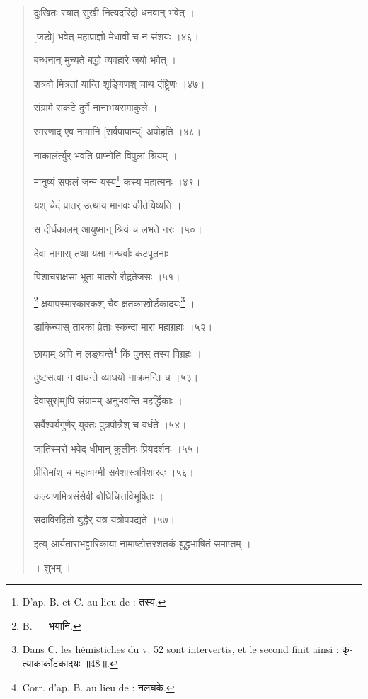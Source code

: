 \documentclass[a4paper, 11pt, oneside, french]{article}
\begin{document}
\begin{quotation}
\texthindi{दुःखितः स्यात् सुखी नित्यदरिद्रो धनवान् भवेत् ।}

\texthindi{[जडो] भवेत् महाप्राज्ञो मेधावी च न संशयः ।४६।}

\bigskip

\texthindi{बन्धनान् मुच्यते बद्धो व्यवहारे जयो भवेत् ।}

\texthindi{शत्रवो मित्रतां यान्ति शृङ्गिणश् चाथ दंष्ट्रिणः ।४७।}

\bigskip

\texthindi{संग्रामे संकटे दुर्गे नानाभयसमाकुले ।}

\texthindi{स्मरणाद् एव नामानि [सर्वपापान्य्] अपोहति ।४८।}

\bigskip

\texthindi{नाकालंर्त्युर् भवति प्राप्नोति विपुलां श्रियम् ।}

\texthindi{मानुष्यं सफलं जन्म यस्य}\footnote{D'ap. B. et C. au lieu de : \texthindi{तस्य.}} \texthindi{कस्य महात्मनः ।४९।}

\bigskip

\texthindi{यश् चेदं प्रातर् उत्थाय मानवः कीर्तयिष्यति ।}

\texthindi{स दीर्घकालम् आयुष्मान् श्रियं च लभते नरः ।५०।}

\bigskip

\texthindi{देवा नागास् तथा यक्षा गन्धर्वाः कटपूतनाः ।}

\texthindi{पिशाचराक्षसा भूता मातरो रौद्रतेजसः ।५१।}

\bigskip

\footnote{B. --- \texthindi{भयानि.}} \texthindi{क्षयापस्मारकारकश् चैव क्षतकाखोर्डकादयः}\footnote{Dans C. les hémistiches du v. 52 sont intervertis, et le second finit ainsi : \texthindi{कृत्याकार्कोटकादयः} \texthindi{॥}48\texthindi{॥}.} \texthindi{।}

\texthindi{डाकिन्यास् तारका प्रेताः स्कन्दा मारा महाग्रहाः ।५२।}

\bigskip

\texthindi{छायाम् अपि न लङ्घन्ते}\footnote{Corr. d'ap. B. au lieu de : \texthindi{नलघके.}} \texthindi{किं पुनस् तस्य विग्रहः ।}

\texthindi{दुष्टसत्वा न वाधन्ते व्याधयो नाक्रमन्ति च ।५३।}

\bigskip

\texthindi{देवासुर[म्]पि संग्रामम् अनुभवन्ति महर्द्धिकाः ।}

\texthindi{सर्वैश्वर्यगुणैर् युक्तः पुत्रपौत्रैश् च वर्धते ।५४।}

\bigskip

\texthindi{जातिस्मरो भवेद् धीमान् कुलीनः प्रियदर्शनः ।५५।}

\bigskip

\texthindi{प्रीतिमांश् च महावाग्मी सर्वशास्त्रविशारदः ।५६।}

\bigskip

\texthindi{कल्याणमित्रसंसेवी बोधिचित्तविभूषितः ।}

\texthindi{सदाविरहितो बुद्धैर् यत्र यत्रोपपद्यते ।५७।}

\bigskip

\texthindi{इत्य् आर्यताराभट्टारिकाया नामाष्टोत्तरशतकं बुद्धभाषितं समाप्तम् ।}

\bigskip

\texthindi{। शुभम् ।}
\end{quotation}
\clearpage
\end{document}
